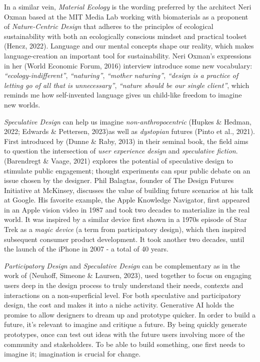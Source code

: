 \documentclass[
  letterpaper,
  DIV=11,
  numbers=noendperiod]{scrartcl}
\begin{document}
In a similar vein, \emph{Material Ecology} is the wording preferred by
the architect Neri Oxman based at the MIT Media Lab working with
biomaterials as a proponent of \emph{Nature-Centric Design} that adheres
to the principles of ecological sustainability with both an ecologically
conscious mindset and practical toolset (Hencz, 2022). Language and our
mental concepts shape our reality, which makes language-creation an
important tool for sustainability. Neri Oxman's expressions in her
(World Economic Forum, 2016) interview introduce some new vocabulary:
\emph{``ecology-indifferent''}, \emph{``naturing''}, \emph{``mother
naturing''}, \emph{``design is a practice of letting go of all that is
unnecessary''}, \emph{``nature should be our single client''}, which
reminds me how self-invented language gives un child-like freedom to
imagine new worlds.

\emph{Speculative Design} can help us imagine \emph{non-anthropocentric}
(Hupkes \& Hedman, 2022; Edwards \& Pettersen, 2023)as well as
\emph{dystopian} futures (Pinto et al., 2021). First introduced by
(Dunne \& Raby, 2013) in their seminal book, the field aims to question
the intersection of \emph{user experience design} and \emph{speculative
fiction}. (Barendregt \& Vaage, 2021) explores the potential of
speculative design to stimulate public engagement; thought experiments
can spur public debate on an issue chosen by the designer. Phil
Balagtas, founder of The Design Futures Initiative at McKinsey,
discusses the value of building future scenarios at his talk at Google.
His favorite example, the Apple Knowledge Navigator, first appeared in
an Apple vision video in 1987 and took two decades to materialize in the
real world. It was inspired by a similar device first shown in a 1970s
episode of Star Trek as a \emph{magic device} (a term from participatory
design), which then inspired subsequent consumer product development. It
took another two decades, until the launch of the iPhone in 2007 - a
total of 40 years.

\emph{Participatory Design} and \emph{Speculative Design} can be
complementary as in the work of (Neuhoff, Simeone \& Laursen, 2023),
used together to focus on engaging users deep in the design process to
truly understand their needs, contexts and interactions on a
non-superficial level. For both speculative and participatory design,
the cost and makes it into a niche activity. Generative AI holds the
promise to allow designers to dream up and prototype quicker. In order
to build a future, it's relevant to imagine and critique a future. By
being quickly generate prototypes, once can test out ideas with the
future users involving more of the community and stakeholders. To be
able to build something, one first needs to imagine it; imagination is
crucial for change.
\end{document}

